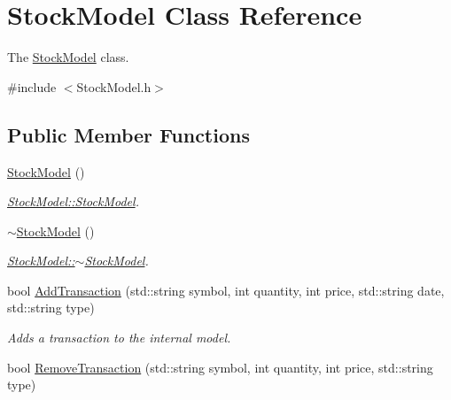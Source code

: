 \hypertarget{class_stock_model}{}\section{Stock\+Model Class Reference}
\label{class_stock_model}


The \mbox{\hyperlink{class_stock_model}{Stock\+Model}} class.  




{\ttfamily \#include $<$Stock\+Model.\+h$>$}

\subsection*{Public Member Functions}
\begin{DoxyCompactItemize}
\item 
\mbox{\label{class_stock_model_a79d89baa0edab731599f13fa63adf8c9}} 
\mbox{\hyperlink{class_stock_model_a79d89baa0edab731599f13fa63adf8c9}{Stock\+Model}} ()
\begin{DoxyCompactList}\small\item\em \mbox{\hyperlink{class_stock_model_a79d89baa0edab731599f13fa63adf8c9}{Stock\+Model\+::\+Stock\+Model}}. \end{DoxyCompactList}\item 
\mbox{\label{class_stock_model_a46abe8e7ba74e65192911a5e3fc65ba5}} 
\mbox{\hyperlink{class_stock_model_a46abe8e7ba74e65192911a5e3fc65ba5}{$\sim$\+Stock\+Model}} ()
\begin{DoxyCompactList}\small\item\em \mbox{\hyperlink{class_stock_model_a46abe8e7ba74e65192911a5e3fc65ba5}{Stock\+Model\+::$\sim$\+Stock\+Model}}. \end{DoxyCompactList}\item 
bool \mbox{\hyperlink{class_stock_model_a6461b20ecb47314c9799a916f42e7e5d}{Add\+Transaction}} (std\+::string symbol, int quantity, int price, std\+::string date, std\+::string type)
\begin{DoxyCompactList}\small\item\em Adds a transaction to the internal model. \end{DoxyCompactList}\item 
bool \mbox{\hyperlink{class_stock_model_ad25fcc267361e7375b60f87c844ac36b}{Remove\+Transaction}} (std\+::string symbol, int quantity, int price, std\+::string type)

\end{DoxyCompactItemize}
